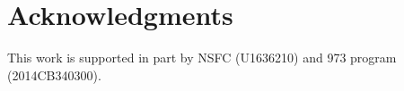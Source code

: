 \documentclass[twocolumn]{svjour3}          %
\begin{document}









\section*{Acknowledgments}
This work is supported in part by NSFC (U1636210) and 973 program ({2014CB340300}).


\balance







\end{document}
